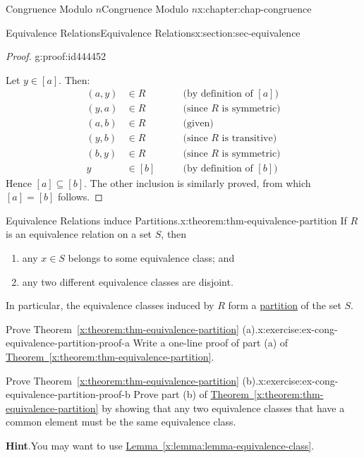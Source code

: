 \documentclass[oneside,10pt,]{book}
\newcommand{\blocktitlefont}{\relax}
\newcommand{\xreffont}{\relax}
\numberwithin{equation}{section}
\newcommand{\amp}{&}
\begin{document}
\begin{chapterptx}{Congruence Modulo \(n\)}{}{Congruence Modulo \(n\)}{}{}{x:chapter:chap-congruence}
\begin{sectionptx}{Equivalence Relations}{}{Equivalence Relations}{}{}{x:section:sec-equivalence}
\begin{proof}{}{g:proof:id444452}
\par
Let \(y \in [a]\). Then:%
\begin{align*}
(a,y) \amp \in R \qquad \amp \text{(by definition of $[a]$)}\\
(y,a) \amp \in R \qquad \amp \text{(since $R$ is symmetric)}\\
(a,b) \amp \in R \qquad \amp \text{(given)}\\
(y,b) \amp \in R \qquad \amp \text{(since $R$ is transitive)}\\
(b,y) \amp \in R \qquad \amp \text{(since $R$ is symmetric)}\\
y \amp \in [b] \qquad \amp \text{(by definition of $[b]$)}
\end{align*}
Hence \([a] \subseteq [b]\). The other inclusion is similarly proved, from which \([a] = [b]\) follows.%
\end{proof}
\begin{theorem}{Equivalence Relations induce Partitions.}{}{x:theorem:thm-equivalence-partition}%
If \(R\) is an equivalence relation on a set \(S\), then%
\begin{enumerate}[label=(\alph*)]
\item{}any \(x \in S\) belongs to some equivalence class; and%
\item{}any two different equivalence classes are disjoint.%
\end{enumerate}
In particular, the equivalence classes induced by \(R\) form a \hyperref[x:definition:def-partition]{partition} of the set \(S\).%
\end{theorem}
\begin{inlineexercise}{Prove Theorem~{\xreffont\ref*{x:theorem:thm-equivalence-partition}} (a).}{x:exercise:ex-cong-equivalence-partition-proof-a}%
Write a one-line proof of part (a) of \hyperref[x:theorem:thm-equivalence-partition]{Theorem~{\xreffont\ref{x:theorem:thm-equivalence-partition}}}.%
\end{inlineexercise}
\begin{inlineexercise}{Prove Theorem~{\xreffont\ref*{x:theorem:thm-equivalence-partition}} (b).}{x:exercise:ex-cong-equivalence-partition-proof-b}%
Prove part (b) of \hyperref[x:theorem:thm-equivalence-partition]{Theorem~{\xreffont\ref{x:theorem:thm-equivalence-partition}}} by showing that any two equivalence classes that have a common element must be the same equivalence class.%
\par\smallskip%
\noindent\textbf{\blocktitlefont Hint}.\hypertarget{g:hint:id444620}{}\quad{}You may want to use \hyperref[x:lemma:lemma-equivalence-class]{Lemma~{\xreffont\ref{x:lemma:lemma-equivalence-class}}}.%

\end{inlineexercise}
\end{sectionptx}
\end{chapterptx}
\end{document}
